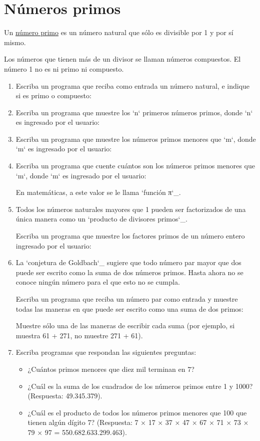 \section{Números primos}

Un \href{http://es.wikipedia.org/wiki/N\%C3\%BAmero\_primo}{número
primo} es un número natural que sólo es divisible por 1 y por sí mismo.

Los números que tienen más de un divisor se llaman números compuestos.
El número 1 no es ni primo ni compuesto.

\begin{enumerate}
\item
  Escriba un programa que reciba como entrada un número natural, e
  indique si es primo o compuesto:
\item
  Escriba un programa que muestre los `n` primeros números primos, donde
  `n` es ingresado por el usuario:
\item
  Escriba un programa que muestre los números primos menores que `m`,
  donde `m` es ingresado por el usuario:
\item
  Escriba un programa que cuente cuántos son los números primos menores
  que `m`, donde `m` es ingresado por el usuario:

  En matemáticas, a este valor se le llama `función π`\_.
\item
  Todos los números naturales mayores que 1 pueden ser factorizados de
  una única manera como un `producto de divisores primos`\_.

  Escriba un programa que muestre los factores primos de un número
  entero ingresado por el usuario:
\item
  La `conjetura de Goldbach`\_ sugiere que todo número par mayor que dos
  puede ser escrito como la suma de dos números primos. Hasta ahora no
  se conoce ningún número para el que esto no se cumpla.

  Escriba un programa que reciba un número par como entrada y muestre
  todas las maneras en que puede ser escrito como una suma de dos
  primos:

  Muestre sólo una de las maneras de escribir cada suma (por ejemplo, si
  muestra 61 + 271, no muestre 271 + 61).
\item
  Escriba programas que respondan las siguientes preguntas:

  \begin{itemize}
  \item
    ¿Cuántos primos menores que diez mil terminan en 7?
  \item
    ¿Cuál es la suma de los cuadrados de los números primos entre 1 y
    1000? (Respuesta: 49.345.379).
  \item
    ¿Cuál es el producto de todos los números primos menores que 100 que
    tienen algún dígito 7? (Respuesta: 7 × 17 × 37 × 47 × 67 × 71 × 73 ×
    79 × 97 = 550.682.633.299.463).
  \end{itemize}
\end{enumerate}
